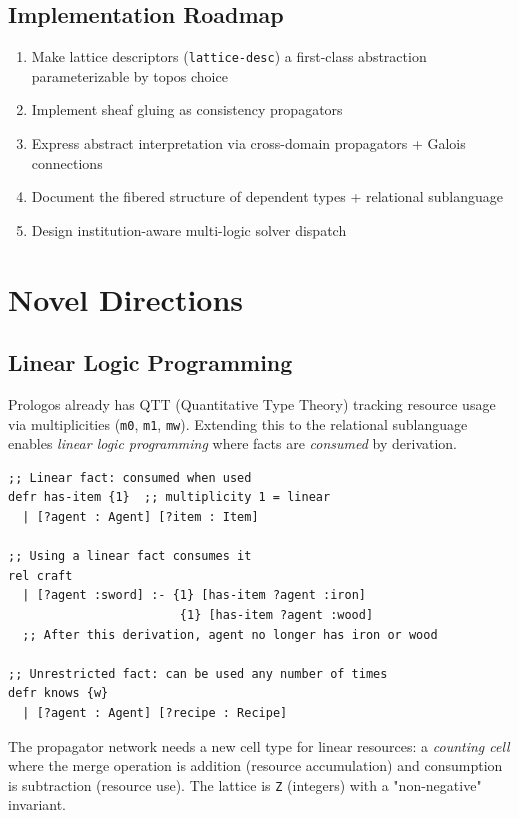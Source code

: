 \documentclass[11pt]{article}
\begin{document}
\subsection{Implementation Roadmap}
\label{sec:orga829ec4}

\begin{enumerate}
\item Make lattice descriptors (\texttt{lattice-desc}) a first-class abstraction
parameterizable by topos choice
\item Implement sheaf gluing as consistency propagators
\item Express abstract interpretation via cross-domain propagators + Galois connections
\item Document the fibered structure of dependent types + relational sublanguage
\item Design institution-aware multi-logic solver dispatch
\end{enumerate}
\section{Novel Directions}
\label{sec:orgfdbb8f3}

\subsection{Linear Logic Programming}
\label{sec:org49d0c8e}

Prologos already has QTT (Quantitative Type Theory) tracking resource usage
via multiplicities (\texttt{m0}, \texttt{m1}, \texttt{mw}). Extending this to the relational
sublanguage enables \emph{linear logic programming} where facts are \emph{consumed}
by derivation.

\begin{verbatim}
;; Linear fact: consumed when used
defr has-item {1}  ;; multiplicity 1 = linear
  | [?agent : Agent] [?item : Item]

;; Using a linear fact consumes it
rel craft
  | [?agent :sword] :- {1} [has-item ?agent :iron]
                        {1} [has-item ?agent :wood]
  ;; After this derivation, agent no longer has iron or wood

;; Unrestricted fact: can be used any number of times
defr knows {w}
  | [?agent : Agent] [?recipe : Recipe]
\end{verbatim}

The propagator network needs a new cell type for linear resources: a
\emph{counting cell} where the merge operation is addition (resource
accumulation) and consumption is subtraction (resource use). The lattice
is \texttt{Z} (integers) with a "non-negative" invariant.
\end{document}
